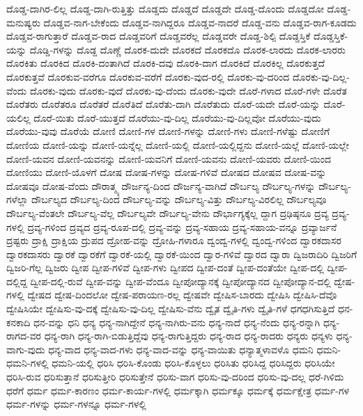 {ದೊಡ್ಡ-ದಾಗಿರ-ಲಿಲ್ಲ
ದೊಡ್ಡ-ದಾಗಿ-ರುತ್ತಿತ್ತು
ದೊಡ್ಡದು
ದೊಡ್ಡದೆ
ದೊಡ್ಡದೇ
ದೊಡ್ಡ-ದೊಂದು
ದೊಡ್ಡದೋ
ದೊಡ್ಡ-ಮನುಷ್ಯರು
ದೊಡ್ಡವ-ನಾಗ-ಬೇಕೆಂದು
ದೊಡ್ಡವ-ನಾಗಿದ್ದರೂ
ದೊಡ್ಡವ-ನಾದರೆ
ದೊಡ್ಡ-ವನು
ದೊಡ್ಡವ-ರಾಗ-ಕೂಡದು
ದೊಡ್ಡವ-ರಾಗುತ್ತಾರೆ
ದೊಡ್ಡವ-ರಾದ
ದೊಡ್ಡವರಿಗೆ
ದೊಡ್ಡವರೆಲ್ಲ
ದೊಡ್ಡವರೇ
ದೊಡ್ಡ-ಶಿಲ್ಪಿ
ದೊಡ್ಡಸ್ತಿಕೆ
ದೊಡ್ಡಸ್ತಿಕೆ-ಯನ್ನು
ದೊಡ್ಡಿ-ಗಳನ್ನು
ದೊಡ್ದ
ದೊಣ್ಣೆ
ದೊರಕ-ದುದೇ
ದೊರಕದೆ
ದೊರಕದೊ
ದೊರಕ-ಲಾರದು
ದೊರಕ-ಲಾರರು
ದೊರಕಿತು
ದೊರಕಿದ
ದೊರಕಿ-ದಂತಾಗಿದೆ
ದೊರಕಿ-ದವು
ದೊರಕಿ-ದಾಗ
ದೊರಕಿದೆ
ದೊರಕಿಲ್ಲ
ದೊರಕುತ್ತದೆ
ದೊರಕುತ್ತವೆ
ದೊರಕುವ-ವರೆಗೂ
ದೊರಕುವ-ವರೆಗೆ
ದೊರಕು-ವುದ-ರಲ್ಲಿ
ದೊರಕು-ವು-ದರಿಂದ
ದೊರಕು-ವು-ದಿಲ್ಲ-ವೆಂದು
ದೊರಕು-ವುದು
ದೊರಕು-ವುದೆ
ದೊರಕು-ವು-ದೆಂದು
ದೊರಕು-ವುದೇ
ದೊರೆ-ಗಳಾದ
ದೊರೆ-ಗಳೇ
ದೊರೆತ
ದೊರೆತರು
ದೊರೆತರೂ
ದೊರೆತರೆ
ದೊರೆತಿದೆ
ದೊರೆತು-ದಾಗಿ
ದೊರೆತುದು
ದೊರೆ-ಯದೇ
ದೊರೆ-ಯನ್ನು
ದೊರೆ-ಯಲಿಲ್ಲ
ದೊರೆ-ಯಿತು
ದೊರೆ-ಯುತ್ತದೆ
ದೊರೆಯು-ವು-ದಿಲ್ಲ
ದೊರೆಯು-ವು-ದಿಲ್ಲವೋ
ದೊರೆಯು-ವುದು
ದೊರೆಯು-ವುವು
ದೊರೆಯೆ
ದೋಣಿ
ದೋಣಿ-ಗಳ
ದೋಣಿ-ಗಳನ್ನು
ದೋಣಿ-ಗಳು
ದೋಣಿ-ಗಳೆಷ್ಟು
ದೋಣಿಗೆ
ದೋಣಿಯ
ದೋಣಿ-ಯನ್ನು
ದೋಣಿ-ಯನ್ನೆಲ್ಲ
ದೋಣಿ-ಯಲ್ಲಿ
ದೋಣಿ-ಯಲ್ಲಿದ್ದನು
ದೋಣಿ-ಯಲ್ಲೆ
ದೋಣಿ-ಯಲ್ಲೇ
ದೋಣಿ-ಯವನ
ದೋಣಿ-ಯವನನ್ನು
ದೋಣಿ-ಯವನಿಗೆ
ದೋಣಿ-ಯವನು
ದೋಣಿ-ಯವರು
ದೋಣಿ-ಯಿಂದ
ದೋಣಿಯು
ದೋಣಿ-ಯೊಳಗೆ
ದೋಷ
ದೋಷ-ಗಳನ್ನು
ದೋಷ-ಗಳಿವೆ
ದೋಷದ
ದೋಷವ
ದೋಷ-ವನ್ನು
ದೋಷವೂ
ದೋಷ-ವೆಂದು
ದೌರಾತ್ಮ್ಯ
ದೌರ್ಜನ್ಯ-ದಿಂದ
ದೌರ್ಜನ್ಯ-ವಾಗಿದೆ
ದೌರ್ಬಲ್ಯ
ದೌರ್ಬಲ್ಯ-ಗಳನ್ನು
ದೌರ್ಬಲ್ಯ-ಗಳೆಲ್ಲಾ
ದೌರ್ಬಲ್ಯದ
ದೌರ್ಬಲ್ಯ-ದಿಂದ
ದೌರ್ಬಲ್ಯ-ವನ್ನು
ದೌರ್ಬಲ್ಯ-ವಿತ್ತು
ದೌರ್ಬಲ್ಯ-ವಿರಲಿಲ್ಲ
ದೌರ್ಬಲ್ಯವೂ
ದೌರ್ಬಲ್ಯ-ವೆಂತಲೇ
ದೌರ್ಬಲ್ಯ-ವೆಲ್ಲ
ದೌರ್ಬಲ್ಯವೇ
ದೌರ್ಬಲ್ಯ-ವೇನು
ದೌರ್ಭಾಗ್ಯಕ್ಕೆಲ್ಲ
ದ್ದಾಗ
ದ್ರಢಿಷ್ಠನೂ
ದ್ರವ್ಯ
ದ್ರವ್ಯ-ಗಳಲ್ಲಿ
ದ್ರವ್ಯ-ಗಳಿಂದ
ದ್ರವ್ಯದ
ದ್ರವ್ಯ-ರೂಪ-ದಲ್ಲಿ
ದ್ರವ್ಯ-ವನ್ನು
ದ್ರವ್ಯ-ಸಹಾಯ
ದ್ರವ್ಯ-ಸಹಾಯ-ವನ್ನೂ
ದ್ರವ್ಯಾರ್ಜನೆ
ದ್ರಷ್ಟರು
ದ್ರಾಕ್ಷಿ
ದ್ರಾಕ್ಷಿಯ
ದ್ರುಪದ
ದ್ರೋಹ-ವನ್ನು
ದ್ರೋಹಿ-ಗಳಾರೂ
ದ್ವಂದ್ವ-ಗಳಲ್ಲಿ
ದ್ವಂದ್ವ-ಗಳಿಂದ
ದ್ವಾರಕದಾಸರ
ದ್ವಾರಕದಾಸರು
ದ್ವಾರಕೆ
ದ್ವಾರಕೆಗೆ
ದ್ವಾರಕೆ-ಯಲ್ಲಿ
ದ್ವಾರಕೆ-ಯಿಂದ
ದ್ವಾರ-ಗಳಿವೆ
ದ್ವಾರದ
ದ್ವಾರಾ
ದ್ವಿಜರಾದಿರಿ
ದ್ವಿಜರಿಗೆ
ದ್ವಿಜರಿ-ಗೆಲ್ಲ
ದ್ವಿಜರು
ದ್ವೀಪ
ದ್ವೀಪ-ಗಳಿವೆ
ದ್ವೀಪ-ಗಳು
ದ್ವೀಪದ
ದ್ವೀಪ-ದಂತೆ
ದ್ವೀಪ-ದಂತೆಯೇ
ದ್ವೀಪ-ದಲ್ಲಿ
ದ್ವೀಪ-ದಲ್ಲಿದ್ದ
ದ್ವೀಪ-ದಲ್ಲಿ-ರುವೆ
ದ್ವೀಪ-ವನ್ನು
ದ್ವೀಪ-ವೆಂದೂ
ದ್ವೀಪೋದ್ಯಾನಕ್ಕೆ
ದ್ವೀಪೋದ್ಯಾನದ
ದ್ವೀಪೋದ್ಯಾನ-ದಲ್ಲಿ
ದ್ವೇಷ-ಗಳಲ್ಲಿ
ದ್ವೇಷದ
ದ್ವೇಷ-ದಿಂದಲೋ
ದ್ವೇಷ-ಪರಾಯಣ-ರಲ್ಲ
ದ್ವೇಷವೇ
ದ್ವೇಷಿಸ-ಬಾರದು
ದ್ವೇಷಿಸಿ
ದ್ವೇಷಿಸಿ-ದೆವೊ
ದ್ವೇಷಿಸಿಯೇ
ದ್ವೇಷಿಸು-ವು-ದಕ್ಕೆ
ದ್ವೇಷಿಸು-ವು-ದಿಲ್ಲ
ದ್ವೇಷಿಸು-ವೆನು
ದ್ವೈತ
ದ್ವೈತಿ-ಗಳು
ದ್ವೈತಿ-ಗಳೆ
ಧಗಧಗಿಸುತ್ತಿದೆ
ಧನ-ಕನಕಾದಿ
ಧನ-ವನ್ನು
ಧನಿ
ಧನ್ಯ
ಧನ್ಯ-ನಾಗಿದ್ದೇನೆ
ಧನ್ಯ-ನಾಗಿರು-ವನು
ಧನ್ಯ-ನಾದೆ
ಧನ್ಯ-ನೆಂದು
ಧನ್ಯ-ರನ್ನಾಗಿ
ಧನ್ಯ-ರಾಗದ-ವರ
ಧನ್ಯ-ರಾಗಿ
ಧನ್ಯ-ರಾಗಿ-ಬಿಡುತ್ತಿದ್ದೆವು
ಧನ್ಯ-ರಾಗುತ್ತಿದ್ದರು
ಧನ್ಯ-ರಾದ
ಧನ್ಯ-ರಾದರು
ಧನ್ಯರು
ಧನ್ಯಳು
ಧನ್ಯ-ವಾಗು-ವುದು
ಧನ್ಯ-ವಾದ
ಧನ್ಯ-ವಾದ-ಗಳು
ಧನ್ಯ-ವಾದ-ವನ್ನು
ಧನ್ಯ-ವಾಯಿತು
ಧನ್ಯಾತ್ಮಳಾವಳೊ
ಧಮನಿ
ಧಮನಿ-ಧಮನಿ-ಗಳಲ್ಲಿ
ಧಮನಿ-ಯಲ್ಲಿ
ಧರಿಸಿ
ಧರಿಸಿ-ಕೊಂಡು
ಧರಿಸಿ-ಕೊಳ್ಳಲು
ಧರಿಸಿತು
ಧರಿಸಿದ್ದ
ಧರಿಸಿದ್ದರು
ಧರಿಸಿಯೇ
ಧರಿಸಿ-ರುವ
ಧರಿಸುತ್ತಾನೆ
ಧರಿಸುತ್ತೀರಿ
ಧರಿಸುತ್ತೇನೆ
ಧರಿಸು-ವಾಗ
ಧರಿಸು-ವು-ದರಿಂದ
ಧರಿಸು-ವು-ದಲ್ಲ
ಧರೆ-ಗಿಳಿದು
ಧರೆಗೆ
ಧರ್ಮ
ಧರ್ಮ-ಕಾರಣಂ
ಧರ್ಮ-ಕಾರ್ಯ-ಗಳಲ್ಲಿ
ಧರ್ಮಕ್ಕಾಗಿ
ಧರ್ಮಕ್ಕೂ
ಧರ್ಮಕ್ಕೆ
ಧರ್ಮಕ್ಷೇತ್ರ
ಧರ್ಮ-ಗಳ
ಧರ್ಮ-ಗಳನ್ನು
ಧರ್ಮ-ಗಳನ್ನೂ
ಧರ್ಮ-ಗಳಲ್ಲಿ
}

